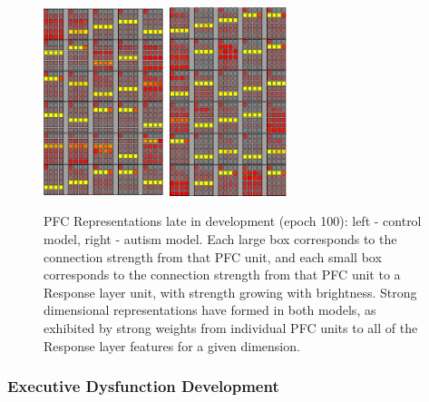 \begin{figure}[th]
\begin{center}
	\includegraphics[width=35mm,height=55mm]{graphs/PFCwts1.100.eps}
	\hspace{18 mm}
	\includegraphics[width=35mm,height=55mm]{graphs/PFCwts54.100.eps}
\end{center}
\caption{PFC Representations late in development
         (epoch 100): left - control model, right -
         autism model.  Each large box corresponds to the connection strength from that PFC unit, and each small box corresponds to the connection strength from that PFC unit to a Response layer unit, with strength growing with brightness.  Strong dimensional representations have formed
         in both models, as exhibited by strong weights from individual PFC units to all of the Response layer features for a given dimension.}  
\label{rep2-figure}
\end{figure} 


\subsubsection{Executive Dysfunction Development} 

